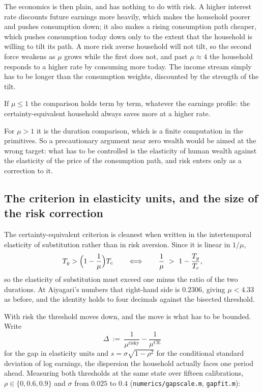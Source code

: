 The economics is then plain, and has nothing to do with risk. A higher interest rate discounts
future earnings more heavily, which makes the household poorer and pushes consumption down; it
also makes a rising consumption path cheaper, which pushes consumption today down only to the
extent that the household is willing to tilt its path. A more risk averse household will not
tilt, so the second force weakens as $\mu$ grows while the first does not, and past $\mu\approx4$
the household responds to a higher rate by consuming more today. The income stream simply has to
be longer than the consumption weights, discounted by the strength of the tilt.

\begin{theorem}\label{thm:ce}
If $\mu\le1$ the comparison holds term by term, whatever the earnings profile: the
certainty-equivalent household always saves more at a higher rate.
\end{theorem}

For $\mu>1$ it is the duration comparison, which is a finite computation in the primitives. So a
precautionary argument near zero wealth would be aimed at the wrong target: what has to be
controlled is the elasticity of human wealth against the elasticity of the price of the
consumption path, and risk enters only as a correction to it.

\subsection{The criterion in elasticity units, and the size of the risk correction}

The certainty-equivalent criterion is cleanest when written in the intertemporal elasticity of
substitution rather than in risk aversion. Since it is linear in $1/\mu$,
\[
  T_y>\Bigl(1-\frac1\mu\Bigr)T_c
  \qquad\Longleftrightarrow\qquad
  \frac1\mu\ >\ 1-\frac{T_y}{T_c} ,
\]
so the elasticity of substitution must exceed one minus the ratio of the two durations. At
Aiyagari's numbers that right-hand side is $0.2306$, giving $\mu<4.33$ as before, and the identity
holds to four decimals against the bisected threshold.

With risk the threshold moves down, and the move is what has to be bounded. Write
\[
  \Delta\ :=\ \frac1{\mu^{\text{risky}}}-\frac1{\mu^{\text{CE}}}
\]
for the gap in elasticity units and $s=\sigma\sqrt{1-\rho^2}$ for the conditional standard
deviation of log earnings, the dispersion the household actually faces one period ahead. Measuring
both thresholds at the same state over fifteen calibrations, $\rho\in\{0,0.6,0.9\}$ and
$\sigma$ from $0.025$ to $0.4$ (\texttt{numerics/gapscale.m}, \texttt{gapfit.m}):

